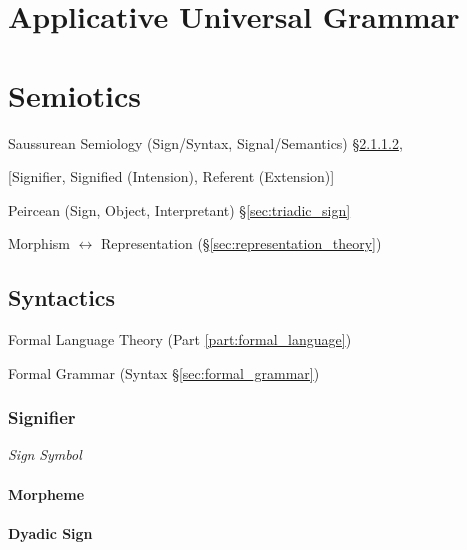 \section{Applicative Universal Grammar}
\label{sec:applicative_universal_grammar}

\section{Semiotics}\label{sec:semiotics}

Saussurean Semiology (Sign/Syntax, Signal/Semantics)
\S\ref{sec:dyadic_sign},

[Signifier, Signified (Intension), Referent (Extension)]

Peircean (Sign, Object, Interpretant) \S\ref{sec:triadic_sign}

Morphism $\leftrightarrow$ Representation
(\S\ref{sec:representation_theory})



\subsection{Syntactics}\label{sec:syntactics}

Formal Language Theory (Part \ref{part:formal_language})

Formal Grammar (Syntax \S\ref{sec:formal_grammar})



\subsubsection{Signifier}\label{sec:signifier}

\emph{Sign} \emph{Symbol}



\paragraph{Morpheme}\label{sec:morpheme}\hfill

\paragraph{Dyadic Sign}\label{sec:dyadic_sign}\hfill

